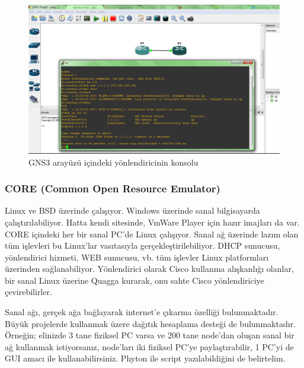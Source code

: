 \begin{figure}[h]
    \centering
    \includegraphics[width=\textwidth]{images/SimulatorGNS3.png}
    \caption{GNS3 arayüzü içindeki yönlendiricinin konsolu}
    \label{fig:GNS3}
\end{figure}

\subsubsection{CORE (Common Open Resource Emulator) }
Linux ve BSD üzerinde çalışıyor. Windows üzerinde sanal bilgisayarda çalıştırılabiliyor. Hatta kendi sitesinde, VmWare Player için hazır imajları da var. CORE içindeki her bir sanal PC'de Linux çalışıyor. Sanal ağ üzerinde lazım olan tüm işlevleri bu Linux'lar vasıtasıyla gerçekleştirilebiliyor. DHCP sunucusu, yönlendirici hizmeti, WEB sunucusu, vb. tüm işlevler Linux platformları üzerinden sağlanabiliyor. Yönlendirici olarak Cisco kullanma alışkanlığı olanlar, bir sanal Linux üzerine Quagga kurarak, onu sahte Cisco yönlendiriciye çevirebilirler.

Sanal ağı, gerçek ağa bağlayarak internet'e çıkarma özelliği bulunmaktadır. Büyük projelerde kullanmak üzere dağıtık hesaplama desteği de bulunmaktadır. Örneğin; elinizde 3 tane fiziksel PC varsa ve 200 tane node'dan oluşan sanal bir ağ kullanmak istiyorsanız, node'ları iki fiziksel PC'ye paylaştırabilir, 1 PC'yi de GUI amacı ile kullanabilirsiniz. Phyton ile script yazılabildiğini de belirtelim.

